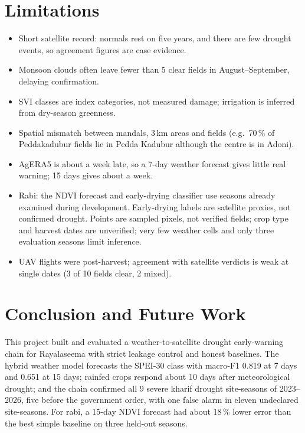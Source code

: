 \documentclass[11pt,a4paper,oneside]{article}
\newcommand{\mf}{macro-F1}
\begin{document}
\section{Limitations}
\begin{itemize}
\item Short satellite record: normals rest on five years, and there are few drought events, so agreement figures are case evidence.
\item Monsoon clouds often leave fewer than 5 clear fields in August--September, delaying confirmation.
\item SVI classes are index categories, not measured damage; irrigation is inferred from dry-season greenness.
\item Spatial mismatch between mandals, 3\,km areas and fields (e.g.\ 70\,\% of Peddakadubur fields lie in Pedda Kadubur although the centre is in Adoni).
\item AgERA5 is about a week late, so a 7-day weather forecast gives little real warning; 15 days gives about a week.
\item Rabi: the NDVI forecast and early-drying classifier use seasons already examined during development. Early-drying labels are satellite proxies, not confirmed drought. Points are sampled pixels, not verified fields; crop type and harvest dates are unverified; very few weather cells and only three evaluation seasons limit inference.
\item UAV flights were post-harvest; agreement with satellite verdicts is weak at single dates (3 of 10 fields clear, 2 mixed).
\end{itemize}

\section{Conclusion and Future Work}
This project built and evaluated a weather-to-satellite drought early-warning chain for Rayalaseema with strict leakage control and honest baselines. The hybrid weather model forecasts the SPEI-30 class with \mf{} 0.819 at 7 days and 0.651 at 15 days; rainfed crops respond about 10 days after meteorological drought; and the chain confirmed all 9 severe kharif drought site-seasons of 2023--2026, five before the government order, with one false alarm in eleven undeclared site-seasons. For rabi, a 15-day NDVI forecast had about 18\,\% lower error than the best simple baseline on three held-out seasons.
\end{document}
